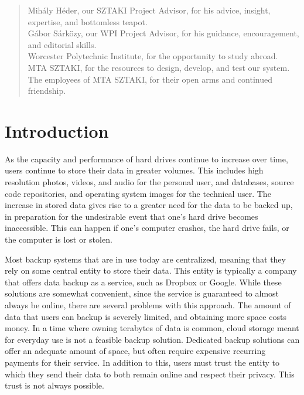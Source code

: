 \documentclass[12pt]{report}
\begin{document}
\renewcommand{\abstractname}{Acknowledgements}
\begin{abstract}
Mih\'aly H\'eder, our SZTAKI Project Advisor, for his advice, insight, expertise, and bottomless teapot.\\

\noindent G\'abor S\'ark\"ozy, our WPI Project Advisor, for his guidance, encouragement, and editorial skills. \\

\noindent Worcester Polytechnic Institute, for the opportunity to study abroad. \\

\noindent MTA SZTAKI, for the resources to design, develop, and test our system. \\

\noindent The employees of MTA SZTAKI, for their open arms and continued friendship.
\end{abstract}

\tableofcontents
\listoffigures

\chapter{Introduction}

As the capacity and performance of hard drives continue to increase over time, users continue to store their data in greater volumes. This includes high resolution photos, videos, and audio for the personal user, and databases, source code repositories, and operating system images for the technical user. The increase in stored data gives rise to a greater need for the data to be backed up, in preparation for the undesirable event that one's hard drive becomes inaccessible. This can happen if one's computer crashes, the hard drive fails, or the computer is lost or stolen.

Most backup systems that are in use today are centralized, meaning that they rely on some central entity to store their data. This entity is typically a company that offers data backup as a service, such as Dropbox or Google. While these solutions are somewhat convenient, since the service is guaranteed to almost always be online, there are several problems with this approach. The amount of data that users can backup is severely limited, and obtaining more space costs money. In a time where owning terabytes of data is common, cloud storage meant for everyday use is not a feasible backup solution. Dedicated backup solutions can offer an adequate amount of space, but often require expensive recurring payments for their service. In addition to this, users must trust the entity to which they send their data to both remain online and respect their privacy. This trust is not always possible.
\end{document}

